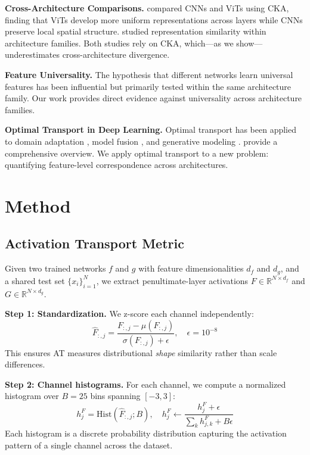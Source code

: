 \documentclass{article}
\begin{document}
\textbf{Cross-Architecture Comparisons.} \citet{raghu2021vision} compared CNNs and ViTs using CKA, finding that ViTs develop more uniform representations across layers while CNNs preserve local spatial structure. \citet{nguyen2021wide} studied representation similarity within architecture families. Both studies rely on CKA, which---as we show---underestimates cross-architecture divergence.

\textbf{Feature Universality.} The hypothesis that different networks learn universal features \citep{li2015convergent,lenc2015understanding} has been influential but primarily tested within the same architecture family. Our work provides direct evidence against universality across architecture families.

\textbf{Optimal Transport in Deep Learning.} Optimal transport has been applied to domain adaptation \citep{courty2017joint}, model fusion \citep{singh2020model}, and generative modeling \citep{arjovsky2017wasserstein}. \citet{peyre2019computational} provide a comprehensive overview. We apply optimal transport to a new problem: quantifying feature-level correspondence across architectures.

\section{Method}
\label{sec:method}

\subsection{Activation Transport Metric}

Given two trained networks $f$ and $g$ with feature dimensionalities $d_f$ and $d_g$, and a shared test set $\{x_i\}_{i=1}^N$, we extract penultimate-layer activations $F \in \mathbb{R}^{N \times d_f}$ and $G \in \mathbb{R}^{N \times d_g}$.

\textbf{Step 1: Standardization.} We z-score each channel independently:
\begin{equation}
    \hat{F}_{:,j} = \frac{F_{:,j} - \mu(F_{:,j})}{\sigma(F_{:,j}) + \epsilon}, \quad \epsilon = 10^{-8}
\end{equation}
This ensures AT measures distributional \emph{shape} similarity rather than scale differences.

\textbf{Step 2: Channel histograms.} For each channel, we compute a normalized histogram over $B = 25$ bins spanning $[-3, 3]$:
\begin{equation}
    h_j^F = \text{Hist}(\hat{F}_{:,j}; B), \quad h_j^F \leftarrow \frac{h_j^F + \epsilon}{\sum_k h_{j,k}^F + B\epsilon}
\end{equation}
Each histogram is a discrete probability distribution capturing the activation pattern of a single channel across the dataset.
\end{document}
